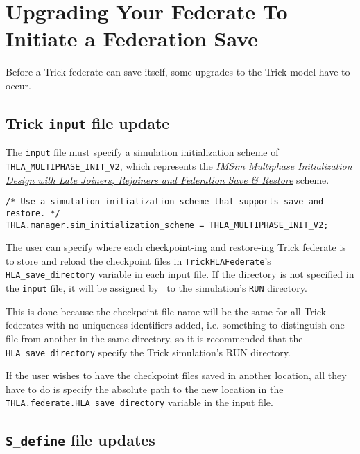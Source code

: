 \chapter{Upgrading Your Federate To Initiate a Federation Save}
\label{sec:hla_fed_save_setup}

Before a Trick federate can save itself, some upgrades to the Trick model
have to occur.

\section{Trick {\tt input} file update}
\label{sec:hla_fed_save_upg_input}

The {\tt input} file must specify a simulation initialization scheme 
of {\tt THLA\_MULTIPHASE\_INIT\_V2}, which represents the
{\em \href{file:IMSim_Multiphase_Init_Design_Document.pdf}
          {IMSim Multiphase Initialization Design with Late Joiners, Rejoiners and Federation Save \& Restore}}
\cite{trickhlaenv:IMSim-multiphase-init-design} scheme.

\begin{verbatim}
/* Use a simulation initialization scheme that supports save and restore. */
THLA.manager.sim_initialization_scheme = THLA_MULTIPHASE_INIT_V2;
\end{verbatim}

The user can specify where each checkpoint-ing and restore-ing Trick federate
is to store and reload the checkpoint files in {\tt TrickHLAFederate}'s
{\tt HLA\_save\_directory} variable in each input file. If the directory is not
specified in the {\tt input} file, it will be assigned by \TrickHLA\ to the
simulation's {\tt RUN} directory.

This is done because the checkpoint file name will be the same for all Trick
federates with no uniqueness identifiers added, i.e. something to distinguish
one file from another in the same directory, so it is recommended that the
{\tt HLA\_save\_directory} specify the Trick simulation's RUN directory.

If the user wishes to have the checkpoint files saved in another location, all
they have to do is specify the absolute path to the new location in 
the {\tt THLA.federate.HLA\_save\_directory} variable in the input file.

\section{{\tt S\_define} file updates}


